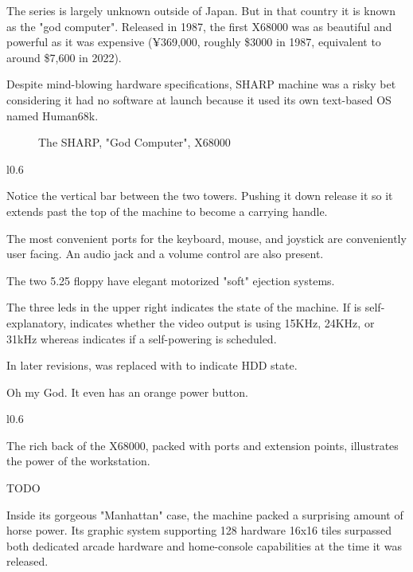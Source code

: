 The series is largely unknown outside of Japan. But in that country it is known as the "god computer". 
Released in 1987, the first X68000 was as beautiful and powerful as it was expensive (¥369,000, roughly \$3000 in 1987, equivalent to around \$7,600 in 2022).

Despite mind-blowing hardware specifications, SHARP machine was a risky bet considering it had no software at launch because it used its own text-based OS named Human68k.

\vfill

 \begin{figure}[H]
\caption*{The SHARP, "God Computer", X68000 }
\end{figure}


\begin{wrapfigure}[31]{l}{0.6\textwidth}\end{wrapfigure}

Notice the vertical bar between the two towers. Pushing it down release it so it extends past the top of the machine to become a carrying handle.


The most convenient ports for the keyboard, mouse, and joystick are conveniently user facing. An audio jack and a volume control are also present.

The two 5.25 floppy have elegant motorized "soft" ejection systems.

The three leds in the upper right indicates the state of the machine. If  is self-explanatory,  indicates whether the video output is using 15KHz, 24KHz, or 31kHz whereas  indicates if a self-powering is scheduled. 

In later revisions,  was replaced with  to indicate HDD state.


Oh my God. It even has an orange power button.

\pagebreak%
\begin{wrapfigure}[6]{l}{0.6\textwidth}\end{wrapfigure}

The rich back of the X68000, packed with ports and extension points, illustrates the power of the workstation.


TODO


\pagebreak




Inside its gorgeous "Manhattan" case, the machine packed a surprising amount of horse power. Its graphic system supporting 128 hardware 16x16 tiles surpassed both dedicated arcade hardware and home-console capabilities at the time it was released.

